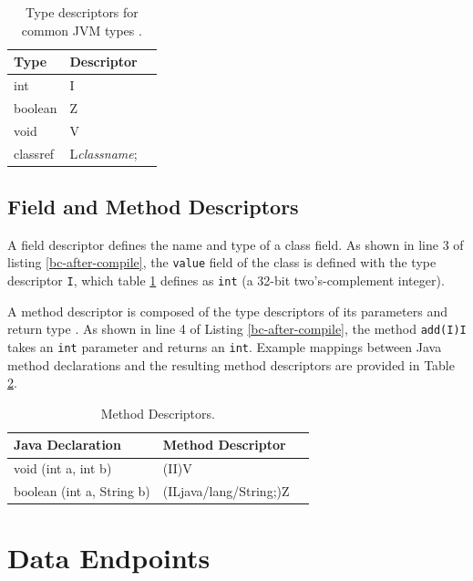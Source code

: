 \begin{table}[htbp]
  \centering
  \begin{tabular}{ | l | l | p{5cm} |}
  \hline
  \textbf{Type} & \textbf{Descriptor} \\ \hline
  int & I \\ \hline
  boolean & Z \\ \hline
  void & V \\ \hline
  classref & L\emph{classname}; \\ \hline
  \end{tabular}
  \caption[Type Descriptors]{Type descriptors for common JVM types \cite[4.3.3]{jvms7}.}
  \label{table:type-descriptors}
\end{table}

\subsection{Field and Method Descriptors}

A field descriptor defines the name and type of a class field.  As shown in line 3 of listing \ref{bc-after-compile}, the \texttt{value} field of the class is defined with the type descriptor \texttt{I}, which table \ref{table:type-descriptors} defines as \texttt{int} (a 32-bit two's-complement integer).

A method descriptor is composed of the type descriptors of its parameters and return type \cite[4.3.3]{jvms7}.  As shown in line 4 of Listing \ref{bc-after-compile}, the method \texttt{add(I)I} takes an \texttt{int} parameter and returns an \texttt{int}.  Example mappings between Java method declarations and the resulting method descriptors are provided in Table \ref{table:method-descriptors}.

\begin{table}[htbp]
  \centering
  \begin{tabular}{ | l | l | p{5cm} |}
  \hline
  \textbf{Java Declaration} & \textbf{Method Descriptor} \\ \hline
  void (int a, int b) & (II)V \\ \hline
  boolean (int a, String b) & (ILjava/lang/String;)Z \\ \hline
  \end{tabular}
  \caption[Method Descriptors]{Method Descriptors.}
  \label{table:method-descriptors}
\end{table}


\section{Data Endpoints}

